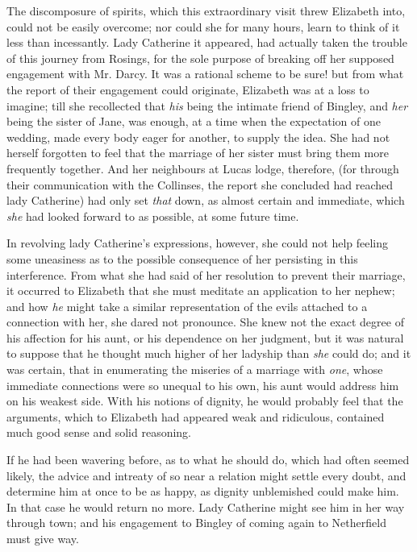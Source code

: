 
The discomposure of spirits, which this extraordinary
visit threw Elizabeth into, could not be easily overcome;
nor could she for many hours, learn to think of it less
than incessantly. Lady Catherine it appeared, had
actually taken the trouble of this journey from Rosings,
for the sole purpose of breaking off her supposed engagement
with Mr. Darcy. It was a rational scheme to be
sure! but from what the report of their engagement could
originate, Elizabeth was at a loss to imagine; till she
recollected that \textit{his} being the intimate friend of Bingley,
and \textit{her} being the sister of Jane, was enough, at a time
when the expectation of one wedding, made every body
eager for another, to supply the idea. She had not herself
forgotten to feel that the marriage of her sister must bring
them more frequently together. And her neighbours at
Lucas lodge, therefore, (for through their communication
with the Collinses, the report she concluded had reached
lady Catherine) had only set \textit{that} down, as almost certain
and immediate, which \textit{she} had looked forward to as possible,
at some future time.

In revolving lady Catherine’s expressions, however, she
could not help feeling some uneasiness as to the possible
consequence of her persisting in this interference. From
what she had said of her resolution to prevent their
marriage, it occurred to Elizabeth that she must meditate
an application to her nephew; and how \textit{he} might take
a similar representation of the evils attached to a connection
with her, she dared not pronounce. She knew not
the exact degree of his affection for his aunt, or his dependence
on her judgment, but it was natural to suppose
that he thought much higher of her ladyship than \textit{she}
could do; and it was certain, that in enumerating the
miseries of a marriage with \textit{one}, whose immediate connections
were so unequal to his own, his aunt would address
him on his weakest side. With his notions of dignity, he
would probably feel that the arguments, which to Elizabeth
had appeared weak and ridiculous, contained much
good sense and solid reasoning.

If he had been wavering before, as to what he should
do, which had often seemed likely, the advice and intreaty
of so near a relation might settle every doubt, and determine
him at once to be as happy, as dignity unblemished
could make him. In that case he would return no more.
Lady Catherine might see him in her way through town;
and his engagement to Bingley of coming again to Netherfield
must give way.

